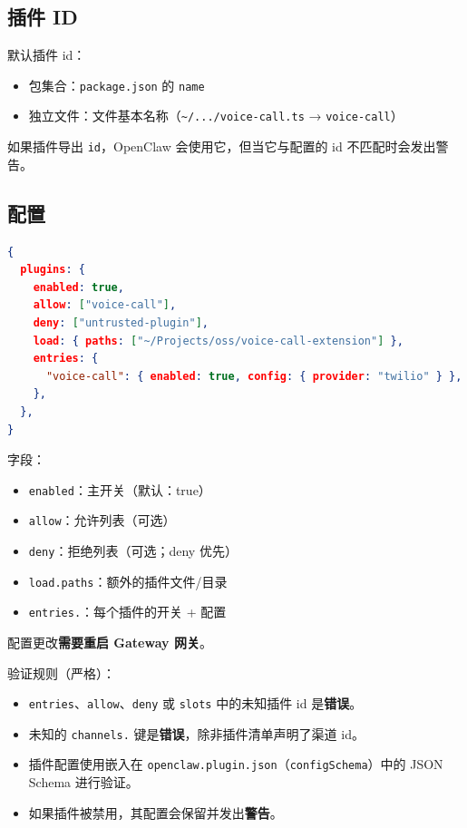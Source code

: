 \subsection{插件 ID}


默认插件 id：

\begin{itemize}
  \item 包集合：\texttt{package.json} 的 \texttt{name}
  \item 独立文件：文件基本名称（\texttt{\textasciitilde{}/.../voice-call.ts} → \texttt{voice-call}）
\end{itemize}


如果插件导出 \texttt{id}，OpenClaw 会使用它，但当它与配置的 id 不匹配时会发出警告。

\subsection{配置}


\begin{lstlisting}[language=json]
{
  plugins: {
    enabled: true,
    allow: ["voice-call"],
    deny: ["untrusted-plugin"],
    load: { paths: ["~/Projects/oss/voice-call-extension"] },
    entries: {
      "voice-call": { enabled: true, config: { provider: "twilio" } },
    },
  },
}
\end{lstlisting}


字段：

\begin{itemize}
  \item \texttt{enabled}：主开关（默认：true）
  \item \texttt{allow}：允许列表（可选）
  \item \texttt{deny}：拒绝列表（可选；deny 优先）
  \item \texttt{load.paths}：额外的插件文件/目录
  \item \texttt{entries.}：每个插件的开关 + 配置
\end{itemize}


配置更改\textbf{需要重启 Gateway 网关}。

验证规则（严格）：

\begin{itemize}
  \item \texttt{entries}、\texttt{allow}、\texttt{deny} 或 \texttt{slots} 中的未知插件 id 是\textbf{错误}。
  \item 未知的 \texttt{channels.} 键是\textbf{错误}，除非插件清单声明了渠道 id。
  \item 插件配置使用嵌入在 \texttt{openclaw.plugin.json}（\texttt{configSchema}）中的 JSON Schema 进行验证。
  \item 如果插件被禁用，其配置会保留并发出\textbf{警告}。
\end{itemize}


